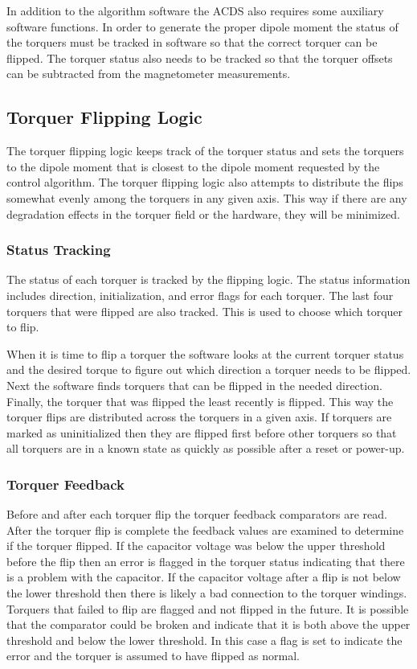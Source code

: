 In addition to the algorithm software the \ac{ACDS} also requires some auxiliary software functions. In order to generate the proper dipole moment the status of the torquers must be tracked in software so that the correct torquer can be flipped. The torquer status also needs to be tracked so that the torquer offsets can be subtracted from the magnetometer measurements. 

\subsection{Torquer Flipping Logic}

The torquer flipping logic keeps track of the torquer status and sets the torquers to the dipole moment that is closest to the dipole moment requested by the control algorithm. The torquer flipping logic also attempts to distribute the flips somewhat evenly among the torquers in any given axis. This way if there are any degradation effects in the torquer field or the hardware, they will be minimized. 

\subsubsection{Status Tracking}

The status of each torquer is tracked by the flipping logic. The status information includes direction, initialization, and error flags for each torquer. The last four torquers that were flipped are also tracked. This is used to choose which torquer to flip.

When it is time to flip a torquer the software looks at the current torquer status and the desired torque to figure out which direction a torquer needs to be flipped. Next the software finds torquers that can be flipped in the needed direction. Finally, the torquer that was flipped the least recently is flipped. This way the torquer flips are distributed across the torquers in a given axis. If torquers are marked as uninitialized then they are flipped first before other torquers so that all torquers are in a known state as quickly as possible after a reset or power-up.

\subsubsection{Torquer Feedback}

Before and after each torquer flip the torquer feedback comparators are read. After the torquer flip is complete the feedback values are examined to determine if the torquer flipped. If the capacitor voltage was below the upper threshold before the flip then an error is flagged in the torquer status indicating that there is a problem with the capacitor. If the capacitor voltage after a flip is not below the lower threshold then there is likely a bad connection to the torquer windings. Torquers that failed to flip are flagged and not flipped in the future. It is possible that the comparator could be broken and indicate that it is both above the upper threshold and below the lower threshold. In this case a flag is set to indicate the error and the torquer is assumed to have flipped as normal.

